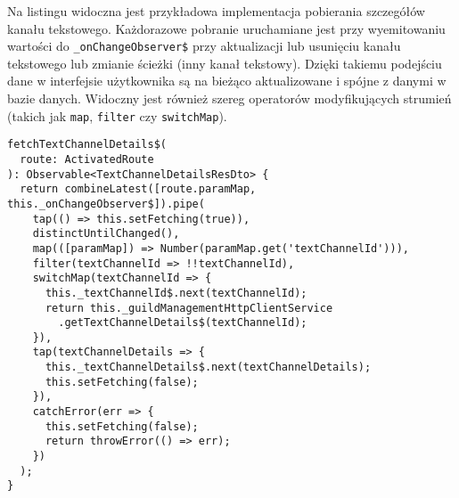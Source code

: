 Na listingu  widoczna jest przykładowa implementacja pobierania szczegółów kanału tekstowego.
Każdorazowe pobranie uruchamiane jest przy wyemitowaniu wartości do \verb|_onChangeObserver$| przy aktualizacji lub
usunięciu kanału tekstowego lub zmianie ścieżki (inny kanał tekstowy). Dzięki takiemu podejściu dane w interfejsie
użytkownika są na bieżąco aktualizowane i spójne z danymi w bazie danych. Widoczny jest również szereg operatorów
modyfikujących strumień (takich jak \verb|map|, \verb|filter| czy \verb|switchMap|).
%
\begin{lstlisting}[style=JSES6Base,label={lis:rxjs},caption={Przykład zastosowania biblioteki \textit{RXJS}.}]
fetchTextChannelDetails$(
  route: ActivatedRoute
): Observable<TextChannelDetailsResDto> {
  return combineLatest([route.paramMap, this._onChangeObserver$]).pipe(
    tap(() => this.setFetching(true)),
    distinctUntilChanged(),
    map(([paramMap]) => Number(paramMap.get('textChannelId'))),
    filter(textChannelId => !!textChannelId),
    switchMap(textChannelId => {
      this._textChannelId$.next(textChannelId);
      return this._guildManagementHttpClientService
        .getTextChannelDetails$(textChannelId);
    }),
    tap(textChannelDetails => {
      this._textChannelDetails$.next(textChannelDetails);
      this.setFetching(false);
    }),
    catchError(err => {
      this.setFetching(false);
      return throwError(() => err);
    })
  );
}
\end{lstlisting}


